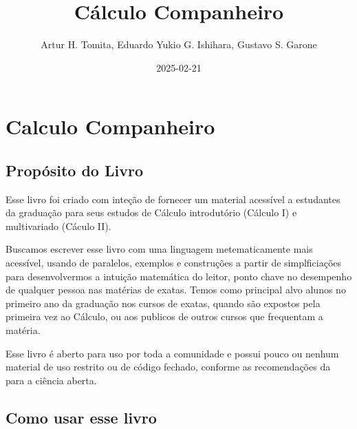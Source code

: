 \documentclass[
  letterpaper,
  DIV=11,
  numbers=noendperiod]{scrreprt}
\title{Cálculo Companheiro}
\author{Artur H. Tomita, Eduardo Yukio G. Ishihara, Gustavo S. Garone}
\date{2025-02-21}
\renewcommand*\contentsname{Índice}
\newcommand\contentsname{Índice}
\begin{document}
\maketitle

\renewcommand*\contentsname{Índice}
{
\hypersetup{linkcolor=}
\setcounter{tocdepth}{2}
\tableofcontents
}


\chapter*{Calculo Companheiro}\label{calculo-companheiro}


\newcommand{\pt}[3]{\frac{\partial^2{#1}}{\partial{#2}\partial{#3}}}
\newcommand{\ptd}[3]{\left. \frac{\partial^2{#1}}{\partial{#2}\partial{#3}} \right \rvert_{(x_0,y_0)}}

\section*{Propósito do Livro}\label{propuxf3sito-do-livro}


Esse livro foi criado com inteção de fornecer um material acessível a
estudantes da graduação para seus estudos de Cálculo introdutório
(Cálculo I) e multivariado (Cáculo II).

Buscamos escrever esse livro com uma linguagem metematicamente mais
acessível, usando de paralelos, exemplos e construções a partir de
simplficiações para desenvolvermos a intuição matemática do leitor,
ponto chave no desempenho de qualquer pessoa nas matérias de exatas.
Temos como principal alvo alunos no primeiro ano da graduação nos cursos
de exatas, quando são expostos pela primeira vez ao Cálculo, ou aos
publicos de outros cursos que frequentam a matéria.

Esse livro é aberto para uso por toda a comunidade e possui pouco ou
nenhum material de uso restrito ou de código fechado, conforme as
recomendações da \textcite{unesco_recomendacao_2022} para a ciência
aberta.

\section*{Como usar esse livro}\label{como-usar-esse-livro}
\end{document}
